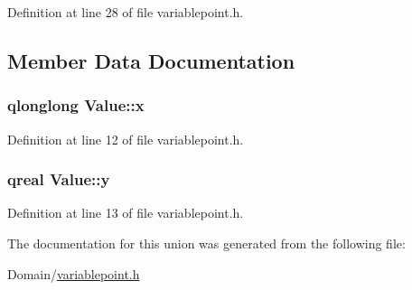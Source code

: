 Definition at line 28 of file variablepoint.\+h.



\subsection{Member Data Documentation}
\hypertarget{union_value_a2964c534a94cb966919c34091dfbf7e4}{}
\subsubsection[{x}]{\setlength{\rightskip}{0pt plus 5cm}qlonglong Value\+::x}\label{union_value_a2964c534a94cb966919c34091dfbf7e4}


Definition at line 12 of file variablepoint.\+h.

\hypertarget{union_value_aad3217882d8e870d8319bb6273211193}{}
\subsubsection[{y}]{\setlength{\rightskip}{0pt plus 5cm}qreal Value\+::y}\label{union_value_aad3217882d8e870d8319bb6273211193}


Definition at line 13 of file variablepoint.\+h.



The documentation for this union was generated from the following file\+:\begin{DoxyCompactItemize}
\item 
Domain/\hyperlink{variablepoint_8h}{variablepoint.\+h}\end{DoxyCompactItemize}

